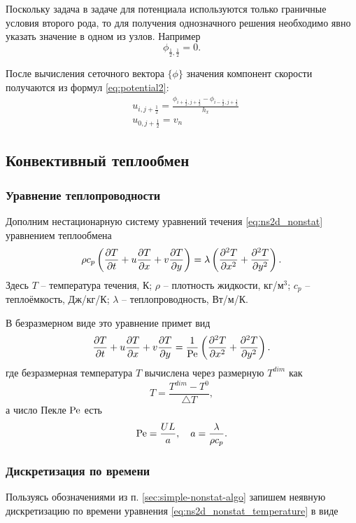 Поскольку задача в задаче для потенциала
используются только граничные условия второго рода,
то для получения однозначного решения необходимо
явно указать значение в одном из узлов. Например
\begin{equation*}
\phi_{\tfrac12, \tfrac12} = 0.
\end{equation*}

После вычисления сеточного вектора $\{\phi\}$
значения компонент скорости получаются из формул \cref{eq:potential2}:
\begin{align*}
	&u_{i, j+\tfrac12} = \frac{\phi_{i+\tfrac12, j+\tfrac12} - \phi_{i-\tfrac12, j+\tfrac12}}{h_x}\\
	&u_{0, j+\tfrac12} = v_n
\end{align*}

\subsection{Конвективный теплообмен}
\subsubsection{Уравнение теплопроводности}

Дополним нестационарную систему уравнений течения \cref{eq:ns2d_nonstat} уравнением теплообмена
\begin{equation*}
\rho c_p\left(\frac{\partial T}{\partial t} + u\frac{\partial T}{\partial x} + v\frac{\partial T}{\partial y}\right) = \lambda\left(\frac{\partial^2 T}{\partial x^2} + \frac{\partial^2 T}{\partial y^2}\right).
\end{equation*}
Здесь $T$ -- температура течения, К; $\rho$ -- плотность жидкости, кг/м$^3$; $c_p$ -- теплоёмкость, Дж/кг/К;
$\lambda$ -- теплопроводность, Вт/м/К.

В безразмерном виде это уравнение примет вид
\begin{equation}
\label{eq:ns2d_nonstat_temperature}
\frac{\partial T}{\partial t} + u\frac{\partial T}{\partial x} + v\frac{\partial T}{\partial y} = \frac{1}{\mathrm{Pe}}\left(\frac{\partial^2 T}{\partial x^2} + \frac{\partial^2 T}{\partial y^2}\right).
\end{equation}
где безразмерная температура $T$ вычислена через размерную $T^{dim}$ как 
$$
T = \frac{T^{dim} - T^0}{\triangle T},
$$
а число Пекле $\mathrm{Pe}$ есть
$$
\mathrm{Pe} = \frac{U L}{a}, \quad a = \frac{\lambda}{\rho c_p}.
$$

\subsubsection{Дискретизация по времени}

Пользуясь обозначениями из п. \ref{sec:simple-nonstat-algo}
запишем неявную дискретизацию по времени уравнения \cref{eq:ns2d_nonstat_temperature} в виде

